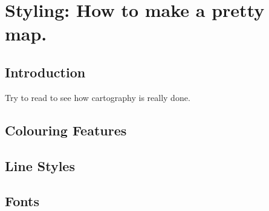 \chapter{Styling: How to make a pretty map.}\label{styling}
\section{Introduction}
Try to read \cite{Peterson2012} to see how cartography is really done.
\section{Colouring Features}
\section{Line Styles}
\section{Fonts}